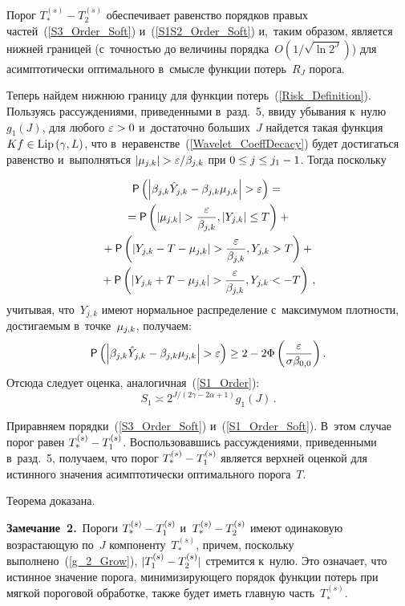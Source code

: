 \begin{multicols}{2}
Порог $T_*^{(s)}-T_2^{(s)}$
обеспечивает равенство порядков правых час\-тей~(\ref{S3_Order_Soft}) 
и~(\ref{S1S2_Order_Soft}) и,~таким образом, является ниж\-ней границей 
(с~точ\-ностью до величины порядка~$O(1/\sqrt{\ln 2^J})$) для асимптотически 
оптимального в~смысле функции потерь~$R_J$ порога.

Теперь найдем нижнюю границу для функции потерь~(\ref{Risk_Definition}). 
Пользуясь рас\-суж\-де\-ни\-ями, приведенными в~разд.~5, вви\-ду убывания к~нулю~$g_1(J)$, 
для любого $\varepsilon\hm>0$ и~до\-ста\-точ\-но больших~$J$ найдется такая 
функция $Kf\hm\in\mathrm{Lip}\,(\gamma,L)$, что в~неравенстве~(\ref{Wavelet_CoeffDecacy}) 
будет достигаться равенство и~выполняться $|\mujk|\hm>\varepsilon/\betajk$ при 
$0\hm\leq j\hm\leq j_1\hm-1$. Тогда поскольку

\vspace*{-6pt}

\noindent
\begin{multline*}
{\sf P}\left(\left|\betajk\hat{Y}_{j,k}-\betajk\mujk\right|>\varepsilon\right)={}\\
{}=
{\sf P}\left(|\mujk|>\fr{\varepsilon}{\betajk},\left\vert Y_{j,k}\right\vert\leq T\right)+{}\\
{}+{\sf P}\left(\left\vert Y_{j,k}-T-\mujk\right\vert >\fr{\varepsilon}{\betajk},
Y_{j,k}>T\right)+{}\\
{}+
{\sf P}\left(\left\vert Y_{j,k}+T-\mujk\right\vert >\fr{\varepsilon}{\betajk},
Y_{j,k}<-T\right)\,,
\end{multline*}
учитывая, что~$Y_{j,k}$ имеют нормальное распределение с~максимумом плот\-ности, 
до\-сти\-га\-емым в~точке~$\mu_{j,k}$, получаем:
$$
{\sf P}\left(\left|\betajk\hat{Y}_{j,k}-\betajk\mujk\right|>\varepsilon\right)\geq
2-2\Phi\left(\fr{\varepsilon}{\sigma\beta_{0,0}}\right).
$$
Отсюда следует оценка, аналогичная~(\ref{S1_Order}):
\begin{equation}
S_1\asymp2^{{J}/({2\gamma-2\alpha+1})}g_1(J)\,.
\label{S1_Order_Soft}
\end{equation}

Приравняем порядки~(\ref{S3_Order_Soft}) и~(\ref{S1_Order_Soft}). 
В~этом случае порог равен $T_*^{(s)}\hm-T_1^{(s)}$.
Воспользовавшись рас\-суж\-де\-ни\-ями, приведенными в~разд.~5, 
получаем, что порог $T_*^{(s)}\hm-T_1^{(s)}$ является верх\-ней оценкой для 
истинного значения асимптотически оптимального порога~$T$.

Теорема доказана.

\smallskip

\noindent
\textbf{Замечание~2.}\ Пороги $T_*^{(s)}\hm-T_1^{(s)}$ и~$T_*^{(s)}\hm-T_2^{(s)}$ 
имеют одинаковую воз\-рас\-та\-ющую по~$J$ компоненту~$T_*^{(s)}$, причем, поскольку 
выполнено~(\ref{g_2_Grow}), $|T_1^{(s)}\hm-T_2^{(s)}|$ стремится к~нулю. 
Это означает, что истинное значение порога, минимизирующего порядок функции 
потерь при мягкой пороговой обработке, также будет иметь глав\-ную часть~$T_*^{(s)}$.


\end{multicols}
